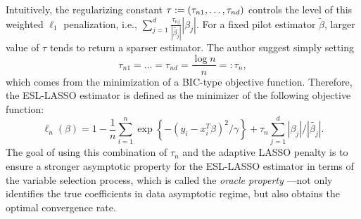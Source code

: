 Intuitively, the regularizing constant $\tau := (\tau_{n1}, \dots, \tau_{nd}) $ controls the level of this weighted $\ell_1$ penalization, i.e., $\sum_{j = 1}^d \frac{\tau_{nj}}{|\tilde{\beta_j}|} |\beta_j|$. For a fixed pilot estimator $\tilde{\beta}$, larger value of $\tau$ tends to return a sparser estimator.  
The author suggest simply setting 
\[
 \tau_{n1} = \dots = \tau_{nd} = \frac{\log n}{n} =: \tau_n,
\] 
which comes from the minimization of a BIC-type objective function. Therefore, the ESL-LASSO estimator is defined as the minimizer of the following objective function:
\[\label{eq:esl_lasso}
\ell_n(\beta)  =    1- \frac{1}{n}\sum_{i = 1}^ n \exp \left\{ -(y_i- x_i^T\beta)^2/\gamma\right\} +  \tau_{n} \sum_{j=1}^d|\beta_j|/|\tilde{\beta_j}|.
\]
The goal of using this combination of $\tau_n$ and the adaptive LASSO penalty is to ensure a stronger asymptotic property for the ESL-LASSO estimator in terms of the variable selection process, which is called the \emph{oracle property} \citep{fan2001variable}---not only identifies the true coefficients in data asymptotic regime, but also obtains the optimal convergence rate. 






















